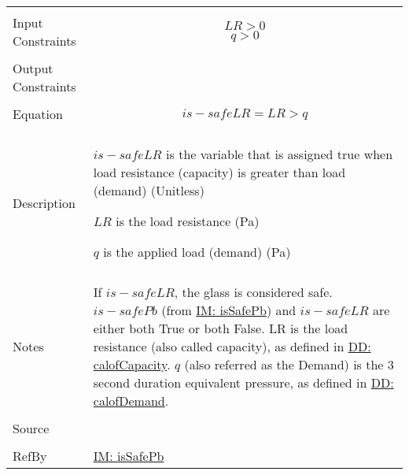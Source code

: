\documentclass[12pt]{article}
\begin{document}
\begin{minipage}{\textwidth}
\begin{tabular}{>{\raggedright}p{}>{\raggedright\arraybackslash}p{}}
\\ \midrule \\
Input Constraints & \begin{displaymath}
                    LR>0
                    \end{displaymath}
                    \begin{displaymath}
                    q>0
                    \end{displaymath}
\\ \midrule \\
Output Constraints & 
\\ \midrule \\
Equation & \begin{displaymath}
           is-safeLR=LR>q
           \end{displaymath}
\\ \midrule \\
Description & \begin{symbDescription}
              \item{$is-safeLR$ is the variable that is assigned true when load resistance (capacity) is greater than load (demand) (Unitless)}
              \item{$LR$ is the load resistance (Pa)}
              \item{$q$ is the applied load (demand) (Pa)}
              \end{symbDescription}
\\ \midrule \\
Notes & If $is-safeLR$, the glass is considered safe. $is-safePb$ (from \hyperref[IM:isSafePb]{IM: isSafePb}) and $is-safeLR$ are either both True or both False. LR is the load resistance (also called capacity), as defined in \hyperref[DD:calofCapacity]{DD: calofCapacity}. $q$ (also referred as the Demand) is the 3 second duration equivalent pressure, as defined in \hyperref[DD:calofDemand]{DD: calofDemand}.
        
\\ \midrule \\
Source & \cite{astm2009}
         
\\ \midrule \\
RefBy & \hyperref[IM:isSafePb]{IM: isSafePb}
        
\\ \bottomrule
\end{tabular}
\end{minipage}
\end{document}
